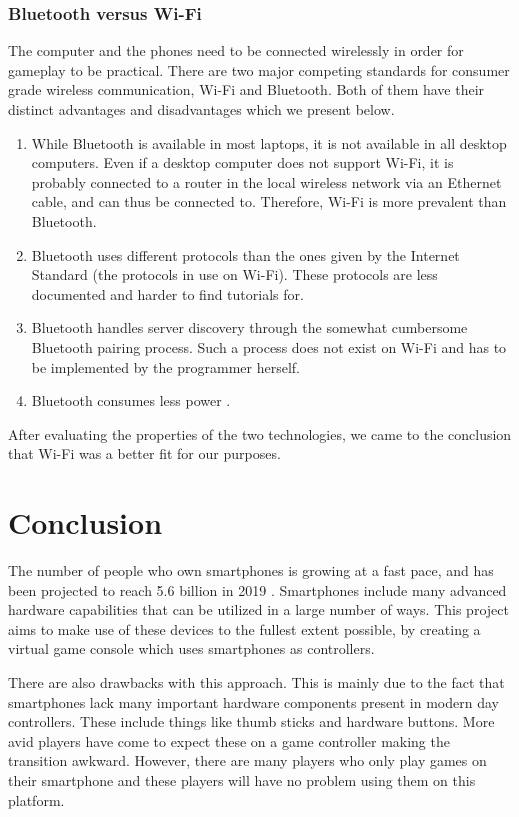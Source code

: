 \documentclass{article}
\begin{document}
\subsubsection{Bluetooth versus Wi-Fi}
The computer and the phones need to be connected wirelessly in order for gameplay to be
practical. There are two major competing standards for consumer grade wireless communication,
Wi-Fi and Bluetooth. Both of them have their distinct advantages and disadvantages which we
present below.
\begin{enumerate}
\item  While Bluetooth is available in most laptops, it is not available in all desktop computers.
Even if a desktop computer does not support Wi-Fi, it is probably connected to a router in
the local wireless network via an Ethernet cable, and can thus be connected to. Therefore,
Wi-Fi is more prevalent than Bluetooth.

\item Bluetooth uses different protocols than the ones given by the Internet Standard (the
protocols in use on Wi-Fi). These protocols are less documented and harder to find
tutorials for.

\item Bluetooth handles server discovery through the somewhat cumbersome Bluetooth pairing
process. Such a process does not exist on Wi-Fi and has to be implemented by the
programmer herself.

\item Bluetooth consumes less power \cite{key:5}.
\end{enumerate}
After evaluating the properties of the two technologies, we came to the conclusion that Wi-Fi
was a better fit for our purposes.

\section{Conclusion}
The number of people who own smartphones is growing at a fast pace, and has been projected to
reach 5.6 billion in 2019 \cite{key:1}. Smartphones include many advanced hardware capabilities that can
be utilized in a large number of ways. This project aims to make use of these devices to the fullest extent possible, by creating a virtual game console which uses smartphones as controllers.

There are also drawbacks with this approach. This is mainly due to the fact that smartphones lack
many important hardware components present in modern day controllers. These include things
like thumb sticks and hardware buttons. More avid players have come to expect these on a game
controller making the transition awkward. However, there are many players who only play
games on their smartphone and these players will have no problem using them on this platform.
\end{document}
